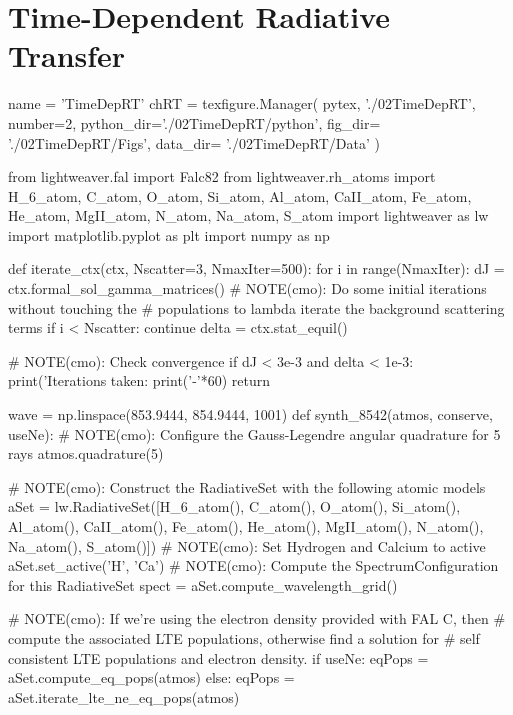 \chapter{Time-Dependent Radiative Transfer}

\begin{pycode}[TimeDepRT]
name = 'TimeDepRT'
chRT = texfigure.Manager(
    pytex,
    './02TimeDepRT',
    number=2,
    python_dir='./02TimeDepRT/python',
    fig_dir=   './02TimeDepRT/Figs',
    data_dir=  './02TimeDepRT/Data'
)
\end{pycode}

\begin{pycode}[TimeDepRT]
from lightweaver.fal import Falc82
from lightweaver.rh_atoms import H_6_atom, C_atom, O_atom, Si_atom, Al_atom, CaII_atom, Fe_atom, He_atom, MgII_atom, N_atom, Na_atom, S_atom
import lightweaver as lw
import matplotlib.pyplot as plt
import numpy as np

def iterate_ctx(ctx, Nscatter=3, NmaxIter=500):
    for i in range(NmaxIter):
        dJ = ctx.formal_sol_gamma_matrices()
        # NOTE(cmo): Do some initial iterations without touching the
        # populations to lambda iterate the background scattering terms
        if i < Nscatter:
            continue
        delta = ctx.stat_equil()

        # NOTE(cmo): Check convergence
        if dJ < 3e-3 and delta < 1e-3:
            print('Iterations taken: %
            print('-'*60)
            return

wave = np.linspace(853.9444, 854.9444, 1001)
def synth_8542(atmos, conserve, useNe):
    # NOTE(cmo): Configure the Gauss-Legendre angular quadrature for 5 rays
    atmos.quadrature(5)

    # NOTE(cmo): Construct the RadiativeSet with the following atomic models
    aSet = lw.RadiativeSet([H_6_atom(), C_atom(), O_atom(), Si_atom(), Al_atom(), CaII_atom(),
                            Fe_atom(), He_atom(), MgII_atom(), N_atom(), Na_atom(), S_atom()])
    # NOTE(cmo): Set Hydrogen and Calcium to active
    aSet.set_active('H', 'Ca')
    # NOTE(cmo): Compute the SpectrumConfiguration for this RadiativeSet
    spect = aSet.compute_wavelength_grid()

    # NOTE(cmo): If we're using the electron density provided with FAL C, then
    # compute the associated LTE populations, otherwise find a solution for
    # self consistent LTE populations and electron density.
    if useNe:
        eqPops = aSet.compute_eq_pops(atmos)
    else:
        eqPops = aSet.iterate_lte_ne_eq_pops(atmos)


\end{pycode}
